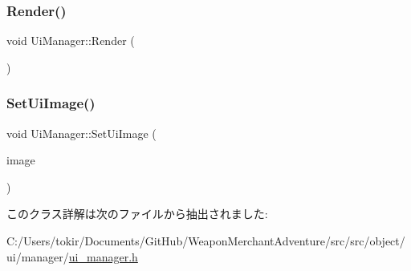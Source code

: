 \mbox{\label{class_ui_manager_a502cad1dd064757aea72ccf1377699b4}} 
\subsubsection{\texorpdfstring{Render()}{Render()}}
{\footnotesize\ttfamily void Ui\+Manager\+::\+Render (\begin{DoxyParamCaption}{ }\end{DoxyParamCaption})\hspace{0.3cm}{\ttfamily [inline]}}

\mbox{\label{class_ui_manager_a13f50b379bf2405061d461dd427190fa}} 
\subsubsection{\texorpdfstring{Set\+Ui\+Image()}{SetUiImage()}}
{\footnotesize\ttfamily void Ui\+Manager\+::\+Set\+Ui\+Image (\begin{DoxyParamCaption}\item[{\mbox{\hyperlink{class_ui_image}{Ui\+Image}} $\ast$}]{image }\end{DoxyParamCaption})\hspace{0.3cm}{\ttfamily [inline]}}



このクラス詳解は次のファイルから抽出されました\+:\begin{DoxyCompactItemize}
\item 
C\+:/\+Users/tokir/\+Documents/\+Git\+Hub/\+Weapon\+Merchant\+Adventure/src/src/object/ui/manager/\mbox{\hyperlink{ui__manager_8h}{ui\+\_\+manager.\+h}}\end{DoxyCompactItemize}
